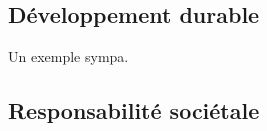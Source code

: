 


\subsection{Développement durable}

Un exemple sympa. \cite{cea-terathermie}


\subsection{Responsabilité sociétale}
